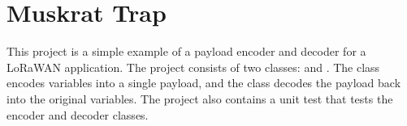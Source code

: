 \chapter{Muskrat Trap}
\hypertarget{index}{}\label{index}
This project is a simple example of a payload encoder and decoder for a Lo\+Ra\+WAN application. The project consists of two classes\+:  and . The  class encodes variables into a single payload, and the  class decodes the payload back into the original variables. The project also contains a unit test that tests the encoder and decoder classes. 
